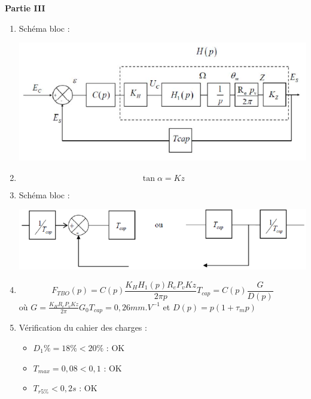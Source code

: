 {\textbf{Partie III}
\begin{enumerate}
\item Schéma bloc :
\begin{center}
\includegraphics[scale=0.5]{png/SB2-cor-pb3.png}
\end{center}
\item \[\tan \alpha = K z\]
\item Schéma bloc :
\begin{center}
\includegraphics[scale=0.5]{png/SB3-cor-pb3.png}
\end{center}
\item \[F_{TBO}(p)=C(p)\frac{K_HH_1(p)R_eP_vKz}{2 \pi p}T_{cap}=C(p)\frac{G}{D(p)}\]
où \( G=\frac{K_HR_eP_vKz}{2 \pi} G_0T_{cap}=0,26mm.V^{-1} \) et \( D(p)=p(1+\tau_m p) \)
\item Vérification du cahier des charges :
\begin{itemize}
\item $D_{1}\%=18\%<20\%$ : OK
\item $T_{max}=0,08<0,1$ : OK
\item $T_{r5\%}<0,2s$ : OK
\end{itemize}
\end{enumerate}
}
\newpage
